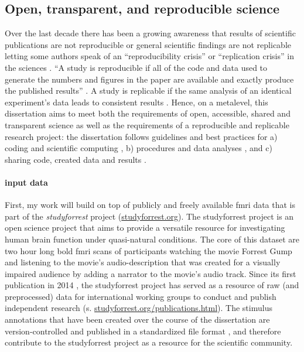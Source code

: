 \subsection{Open, transparent, and reproducible science}

Over the last decade there has been a growing awareness that results of
scientific publications are not reproducible or general scientific findings are
not replicable letting some authors speak of an ``reproducibility crisis'' or
``replication crisis'' in the sciences \citep{baker2016reproducibility,
plesser2018reproducibility, stupple2019reproducibility, nosek2022replicability}.
``A study is reproducible if all of the code and data used to generate the
numbers and figures in the paper are available and exactly produce the published
results'' \citep{leek2017most}.
A study is replicable if the same analysis of an identical experiment's data
leads to consistent results \citep{dubois2016building, leek2017most}.
%
Hence, on a metalevel, this dissertation aims to meet both the requirements of
open, accessible, shared and transparent science \citep{watson2015will,
fecher2014open} as well as the requirements of a reproducible and replicable
research project:
%
the dissertation follows guidelines and best practices for a) coding and
scientific computing \citep{wilson2014best}, b) procedures and data analyses
\citep{nichols2017best, poldrack2017scanning, poldrack2019establishment}, and c)
sharing code, created data and results \citep{eglen2017toward, nichols2017best,
pernet2015improving}.


\paragraph{input data}

First, my work will build on top of publicly and freely available \ac{fmri} data
that is part of the \textit{studyforrest} project
(\href{www.studyforrest.org}{studyforrest.org}).
%
The studyforrest project is an open science project that aims to provide a
versatile resource for investigating human brain function under quasi-natural
conditions.
%
The core of this dataset are two hour long \ac{bold} \ac{fmri} scans of
participants watching the movie Forrest Gump and listening to the movie's
audio-description that was created for a visually impaired audience by adding a
narrator to the movie's audio track.
%
Since its first publication in 2014 \citep{hanke2014audiomovie}, the
studyforrest project has served as a resource of raw (and preprocessed) data for
international working groups to conduct and publish independent research (s.
\href{www.studyforrest.org/publications.html}{studyforrest.org/publications.html}).
%
The stimulus annotations that have been created over the course of the
dissertation are version-controlled and published in a standardized file format
\citep{haeusler2021speechanno}, and therefore contribute to the studyforrest
project as a resource for the scientific community.


